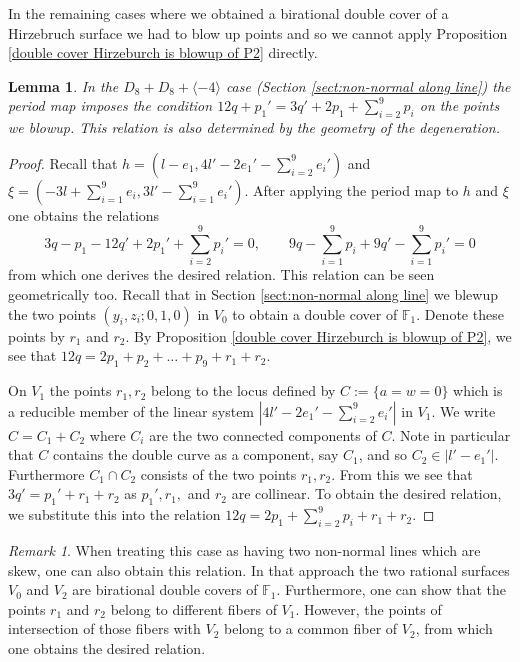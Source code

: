 \documentclass[a4paper]{amsart}
\theoremstyle{definition}
\theoremstyle{plain}
\newtheorem{lemma}[defn]{Lemma}
\theoremstyle{remark}
\newtheorem{rk}[defn]{Remark}
\newcommand{\F}{\mathbb{F}}
\begin{document}
In the remaining cases where we obtained a birational double cover of a Hirzebruch surface we had to blow up points and so we cannot apply Proposition \ref{double cover Hirzeburch is blowup of P2} directly.

\begin{lemma}
In the $D_{8}+D_8+\langle -4 \rangle$ case (Section \ref{sect:non-normal along line}) the period map imposes the condition $12q+p_1'=3q'+2p_1+\sum_{i=2}^9p_i$ on the points we blowup. This relation is also determined by the geometry of the degeneration.
\end{lemma}

\begin{proof}
Recall that $h = (l-e_1,4l'-2e_1'-\sum_{i=2}^9e_i')$ and $\xi= (-3l+\sum_{i=1}^9e_i,3l'-\sum_{i=1}^9e_i')$. After applying the period map to $h$ and $\xi$ one obtains the relations
$$3q-p_1 -12q' + 2p_1'+\sum_{i=2}^9p_i'=0,\qquad
    9q-\sum_{i=1}^9p_i+9q'-\sum_{i=1}^9p_i'=0$$
from which one derives the desired relation. This relation can be seen geometrically too. Recall that in Section \ref{sect:non-normal along line} we blewup the two points $(y_i,z_i;0,1,0)$ in $V_0$ to obtain a double cover of $\F_1$. Denote these points by $r_1$ and $r_2$. By Proposition \ref{double cover Hirzeburch is blowup of P2}, we see that $12q=2p_1+p_2+\dots+p_9+r_1+r_2$. 

On $V_1$ the points $r_1, r_2$ belong to the locus defined by $C := \{a=w=0\}$ which is a reducible member of the linear system $|4l'-2e_1'-\sum_{i=2}^9e_i'|$ in $V_1$. We write $C=C_1+C_2$ where $C_i$ are the two connected components of $C$. Note in particular that $C$ contains the double curve as a component, say $C_1$, and so $C_2 \in |l'-e_1'|$. Furthermore $C_1 \cap C_2$ consists of the two points $r_1,r_2$. From this we see that $3q'=p_1'+r_1+r_2$ as $p_1',r_1,$ and $r_2$ are collinear. To obtain the desired relation, we substitute this into the relation $12q=2p_1+\sum_{i=2}^9p_i+r_1+r_2$.
\end{proof}

\begin{rk}
When treating this case as having two non-normal lines which are skew, one can also obtain this relation. In that approach the two rational surfaces $V_0$ and $V_2$ are birational double covers of $\F_1$. Furthermore, one can show that the points $r_1$ and $r_2$ belong to different fibers of $V_1$. However, the points of intersection of those fibers with $V_2$ belong to a common fiber of $V_2$, from which one obtains the desired relation.
\end{rk}
\end{document}
